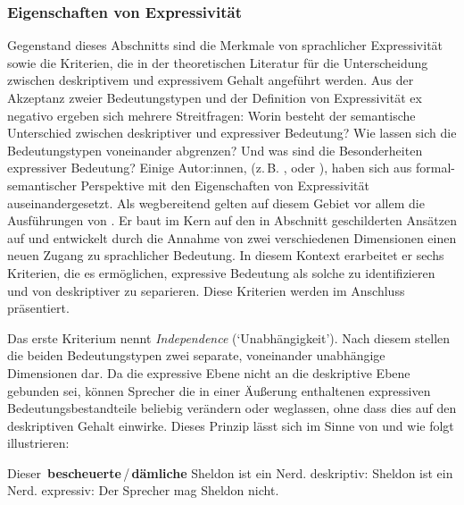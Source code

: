 \subsubsection{Eigenschaften von Expressivität}  \label{Eigenschaften}
Gegenstand dieses Abschnitts sind die Merkmale von sprachlicher Expressivität sowie die Kriterien, die in der theoretischen Literatur für die Unterscheidung zwischen deskriptivem und expressivem Gehalt angeführt werden. Aus der Akzeptanz zweier Bedeutungstypen und der Definition von Expressivität ex negativo ergeben sich mehrere Streitfragen: Worin besteht der semantische Unterschied zwischen deskriptiver und expressiver Bedeutung? Wie lassen sich die Bedeutungstypen voneinander abgrenzen? Und was sind die Besonderheiten expressiver Bedeutung? 
Einige Autor:innen, (z.\,B. {\citealt[]{Cruse.1986}}, {\citealt[]{Kaplan.1997}} oder {\citealt[]{Potts.2005, Potts.2007a}}), haben sich aus formal-semantischer Perspektive mit den Eigenschaften von Expressivität auseinandergesetzt. Als wegbereitend gelten auf diesem Gebiet vor allem die Ausführungen von {\citet[]{Potts.2007a}}. Er baut im Kern auf den in Abschnitt {} geschilderten Ansätzen auf und entwickelt durch die Annahme von zwei verschiedenen Dimensionen einen neuen Zugang zu sprachlicher Bedeutung. In diesem Kontext erarbeitet er sechs Kriterien, die es ermöglichen, expressive Bedeutung als solche zu identifizieren und von deskriptiver zu separieren. Diese Kriterien werden im Anschluss präsentiert.

Das erste Kriterium nennt \citet[167ff.]{Potts.2007a} \textit{Independence} (`Unabhängigkeit'). Nach diesem stellen die beiden Bedeutungstypen zwei separate, voneinander unabhängige Dimensionen dar. Da die expressive Ebene nicht an die deskriptive Ebene gebunden sei, können Sprecher die in einer Äußerung enthaltenen expressiven Bedeutungsbestandteile beliebig verändern oder weglassen, ohne dass dies auf den deskriptiven Gehalt einwirke. Dieses {Prinzip} lässt sich im Sinne von \citet[168]{Potts.2007a} und \citet[9]{dAvis.2019b} wie folgt illustrieren:

\ea  Dieser \,\textbf{bescheuerte}\,/\,\textbf{dämliche} Sheldon ist ein Nerd. \label{sheldon}
\ea deskriptiv: Sheldon ist ein Nerd.
\ex expressiv: Der Sprecher mag Sheldon nicht.
 \z
 \z

